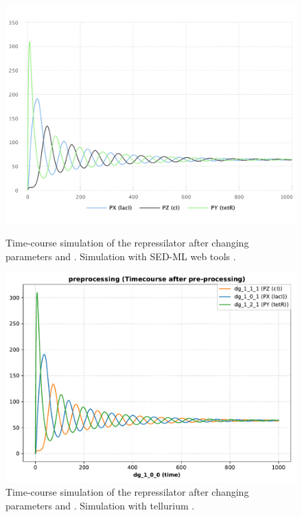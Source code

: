 \begin{figure}[ht]
    \centering
    \begin{minipage}{0.47\textwidth}
        \centering
        \includegraphics[width=1.0\textwidth]{examples/repressilator/results/sedml_webtools/preprocessing}
        \caption{Time-course simulation of the repressilator after changing parameters  and . Simulation with SED-ML web tools \citep{bergmann2017sed}.}
        \label{fig:rep_pre1}
    \end{minipage}\hfill
    \begin{minipage}{0.47\textwidth}
        \centering
        \includegraphics[width=1.0\textwidth]{examples/repressilator/results/tellurium/preprocessing}
        \caption{Time-course simulation of the repressilator after changing parameters  and . Simulation with tellurium \citep{tellurium}.}
        \label{fig:rep_pre2}
    \end{minipage}
\end{figure}



